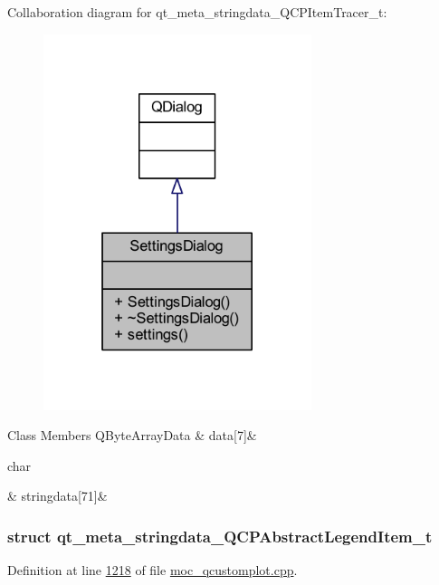 Collaboration diagram for qt\+\_\+meta\+\_\+stringdata\+\_\+\+Q\+C\+P\+Item\+Tracer\+\_\+t\+:
\nopagebreak
\begin{figure}[H]
\begin{center}
\leavevmode
\includegraphics[width=222pt]{d8/d17/a00304}
\end{center}
\end{figure}
\begin{DoxyFields}{Class Members}
\hypertarget{a00067_a87c91fdce2044ef334c2cfd91e38ac00}{Q\+Byte\+Array\+Data}\label{a00067_a87c91fdce2044ef334c2cfd91e38ac00}
&
data\mbox{[}7\mbox{]}&
\\
\hline

\hypertarget{a00067_a28c4c1cde887cbe6b6af18ce9d6ed867}{char}\label{a00067_a28c4c1cde887cbe6b6af18ce9d6ed867}
&
stringdata\mbox{[}71\mbox{]}&
\\
\hline

\end{DoxyFields}
\label{d9/dd0/a00191}
\hypertarget{a00067_d9/dd0/a00191}{}
\subsubsection{struct qt\+\_\+meta\+\_\+stringdata\+\_\+\+Q\+C\+P\+Abstract\+Legend\+Item\+\_\+t}


Definition at line \hyperlink{a00067_source_l01218}{1218} of file \hyperlink{a00067_source}{moc\+\_\+qcustomplot.\+cpp}.



